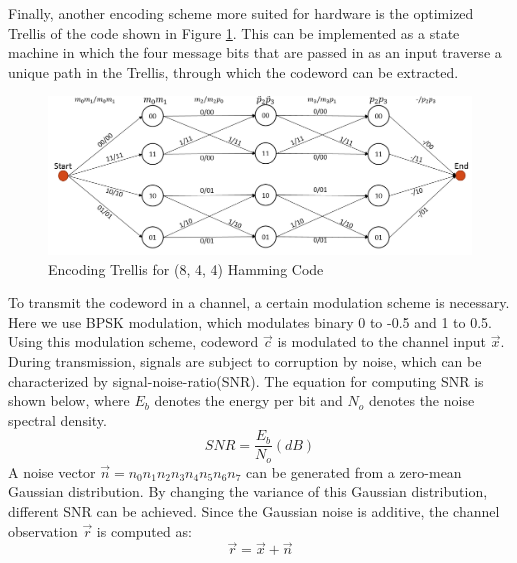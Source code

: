 \documentclass[conference]{IEEEtran}
\begin{document}
Finally, another encoding scheme more suited for hardware is the optimized Trellis of the code shown in Figure \ref{fig:trellis}. This can be implemented as a state machine in which the four message bits that are passed in as an input traverse a unique path in the Trellis, through which the codeword can be extracted. 
\begin{figure}[h!]
\centering
\includegraphics[scale=0.3]{trellis}
\caption{Encoding Trellis for (8, 4, 4) Hamming Code}
\label{fig:trellis}
\end{figure}

To transmit the codeword in a channel, a certain modulation scheme is necessary. Here we use BPSK modulation, which modulates binary 0 to -0.5 and 1 to 0.5. Using this modulation scheme, codeword $\vec{c}$ is modulated to the channel input $\vec{x}$. During transmission, signals are subject to corruption by noise, which can be characterized by signal-noise-ratio(SNR). The equation for computing SNR is shown below, where $E_{b}$ denotes the energy per bit and $N_{o}$ denotes the noise spectral density. 
\begin{equation}
SNR = \frac{E_{b}}{N_{o}} (dB)
\end{equation}
A noise vector $\vec{n}=n_{0}n_{1}n_{2}n_{3}n_{4}n_{5}n_{6}n_{7}$ can be generated from a zero-mean Gaussian distribution. By changing the variance of this Gaussian distribution, different SNR can be achieved. Since the Gaussian noise is additive, the channel observation $\vec{r}$ is computed as: 
\begin{equation}
\vec{r}=\vec{x}+\vec{n}
\end{equation}
\end{document}
